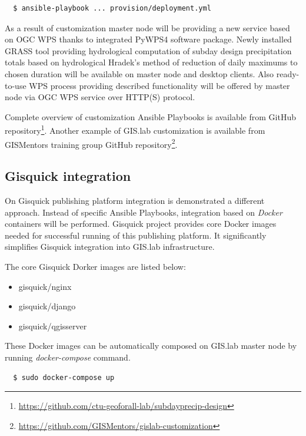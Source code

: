 \documentclass{isprs}
\begin{document}
\begin{lstlisting}
  $ ansible-playbook ... provision/deployment.yml
\end{lstlisting}

As a result of customization master node will be providing a new
service based on OGC WPS thanks to integrated PyWPS4 software
package. Newly installed GRASS tool providing hydrological computation
of subday design precipitation totals based on hydrological Hradek's
method of reduction of daily maximums to chosen duration will be
available on master node and desktop clients. Also ready-to-use WPS
process providing described functionality will be offered by master
node via OGC WPS service over HTTP(S) protocol.

Complete overview of customization Ansible Playbooks is available from
GitHub
repository\footnote{\url{https://github.com/ctu-geoforall-lab/subdayprecip-design}}. Another
example of GIS.lab customization is available from GISMentors training
group GitHub
repository\footnote{\url{https://github.com/GISMentors/gislab-customization}}.

\subsection{Gisquick integration}

On Gisquick publishing platform integration is demonstrated a
different approach. Instead of specific Ansible Playbooks, integration
based on \textit{Docker} containers will be performed. Gisquick
project provides core Docker images needed for successful running of
this publishing platform. It significantly simplifies Gisquick
integration into GIS.lab infrastructure.

The core Gisquick Dorker images are listed below:

\begin{itemize}
\setlength\itemsep{0em}\setlength\parskip{0em}\setlength\topsep{0em}\setlength\partopsep{0em}\setlength\parsep{0em}
\item{gisquick/nginx}
\item{gisquick/django}
\item{gisquick/qgisserver}
\end{itemize}

These Docker images can be automatically composed on GIS.lab master
node by running \textit{docker-compose} command.

\begin{lstlisting}
  $ sudo docker-compose up
\end{lstlisting}
\end{document}
